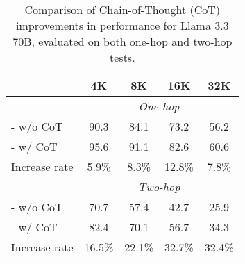 \begin{table}[t!]
        \small
	\setlength\tabcolsep{3pt}
	\centering
	\begin{tabular}{lcccc}
		\toprule
         & {\textbf{4K}} & {\textbf{8K}} & {\textbf{16K}} & {\textbf{32K}} \\
        \midrule
        &\multicolumn{4}{c}{\emph{One-hop}} \\
        - w/o CoT     & 90.3 & 84.1          & 73.2           & 56.2 \\
        - w/ CoT    & 95.6 & 91.1 & 82.6 & 60.6 \\
        Increase rate     & 5.9\% & 8.3\% & 12.8\% & 7.8\% \\
        \midrule
        &\multicolumn{4}{c}{\emph{Two-hop}} \\
        - w/o CoT    & 70.7 & 57.4 & 42.7 &  25.9 \\
        - w/ CoT    & 82.4 & 70.1 & 56.7 & 34.3 \\
        Increase rate     & 16.5\% & 22.1\% & 32.7\% & 32.4\% \\
		\bottomrule
	\end{tabular}
	\caption{Comparison of Chain-of-Thought (CoT) improvements in performance for Llama 3.3 70B, evaluated on both one-hop and two-hop tests.}
	\label{tab:results_w_reasoning}
\end{table}